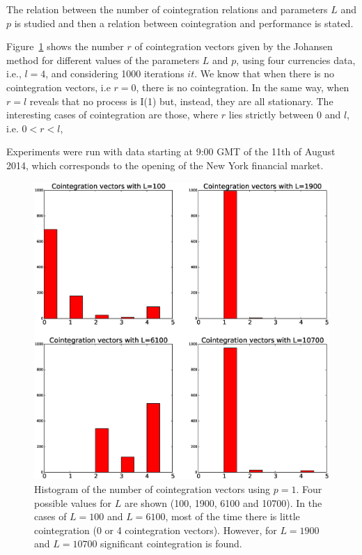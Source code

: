 The relation between the number of cointegration relations and parameters $L$
and $p$ is studied and then a relation between cointegration and performance is
stated.

Figure~\ref{fig:hists} shows the number $r$ of cointegration vectors given by
the Johansen method for different values of the parameters $L$ and $p$, using
four currencies data, i.e., $l=4$, and considering 1000 iterations $it$.
We know that when there is no cointegration vectors, i.e $r=0$, 
there is no cointegration. In the same way, when $r=l$ reveals that no process is I(1) but,
instead, they are all stationary.
The interesting cases of cointegration are those, where $r$ lies strictly
between $0$ and $l$, i.e. $0<r<l$, 

Experiments were run with data starting at 9:00 GMT of the 11th of August 2014,
which corresponds to the opening of the New York financial market.

\begin{figure}[!h]
  \centering
  \includegraphics[width=\textwidth]{img/histCointVectors}
  \caption{Histogram of the number of cointegration vectors using $p=1$. Four
  possible values for $L$ are shown (100, 1900, 6100 and 10700).
  In the cases of $L=100$ and $L=6100$, most of the time there is little
  cointegration (0 or 4 cointegration vectors). However, for $L=1900$ and
  $L=10700$ significant cointegration is found.}
  \label{fig:hists}
\end{figure}

